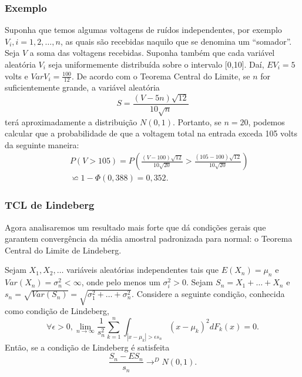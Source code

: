 \begin{frame}
\frametitle{\textbf{Exemplo}}


\begin{exem}
Suponha que temos algumas voltagens de ruídos independentes, por
exemplo $V_i,i=1,2,\ldots,n$, as quais são recebidas naquilo que se
denomina um ``somador''. Seja $V$ a soma das voltagens recebidas.
Suponha também que cada variável aleatória $V_i$ seja uniformemente
distribuída sobre o intervalo [0,10]. Daí, $EV_i=5$ volts e $Var
V_i=\frac{100}{12}$. De acordo com o Teorema Central do Limite, se
$n$ for suficientemente grande, a variável aleatória
$$S=\frac{(V-5n)\sqrt{12}}{10\sqrt{n}}$$
terá aproximadamente a distribuição $N(0,1)$. Portanto, se $n=20$,
podemos calcular que a probabilidade de que a voltagem total na
entrada exceda 105 volts da seguinte maneira:
\begin{eqnarray}
& & P(V>105)=P(\frac{(V-100)\sqrt{12}}{10\sqrt{20}}>\frac{(105-100)\sqrt{12}}{10\sqrt{20}})\nonumber\\
&  & \backsimeq1-\Phi(0,388)=0,352.\nonumber
\end{eqnarray}
\end{exem}

\end{frame}

\begin{frame}
\frametitle{\textbf{TCL de Lindeberg}}


Agora analisaremos um resultado mais forte que dá condições gerais
que garantem convergência da média amostral padronizada para normal:
o Teorema Central do Limite de Lindeberg.

\begin{teo}
Sejam $X_1,X_2,\ldots$ variáveis aleatórias independentes tais que
$E(X_n)=\mu_n$ e $Var (X_n)=\sigma_n^2<\infty$, onde pelo menos um
$\sigma_i^2>0$. Sejam $S_n=X_1+\ldots+X_n$ e $s_n=\sqrt{Var
(S_n)}=\sqrt{\sigma_1^2+\ldots+\sigma_n^2}$. Considere a seguinte
condição, conhecida como condição de Lindeberg,
$$\forall\epsilon>0,\lim_{n\rightarrow\infty}\frac{1}{s_n^2}\sum_{k=1}^{n}\int_{|x-\mu_k|>\epsilon s_n}(x-\mu_k)^2dF_k(x)=0.$$
Então, se a condição de Lindeberg é satisfeita
$$\frac{S_n-ES_n}{s_n}\rightarrow^D N(0,1).$$
\end{teo}

\end{frame}

